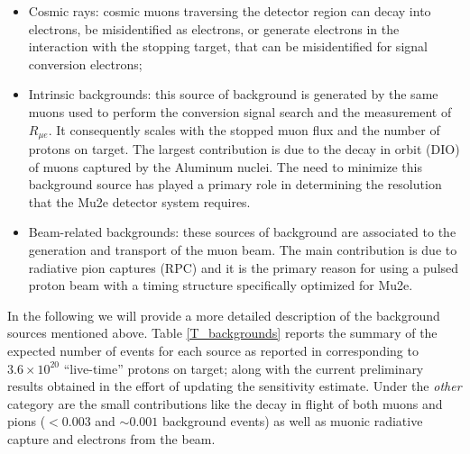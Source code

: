 \documentclass[12pt,a4paper,openright, oneside, titlepage]{book} %
\begin{document}
\begin{itemize}
\item Cosmic rays: cosmic muons traversing the detector region can decay into electrons, be misidentified as electrons, or generate electrons in the interaction with the stopping target, that can be misidentified for signal conversion electrons; 
\item Intrinsic backgrounds: this source of background is generated by the same muons used to perform the conversion signal search and the measurement of $R_{\mu e}$. 
It consequently scales with the stopped muon flux and the number of protons on target. 
The largest contribution is due to the decay in orbit (DIO) of muons captured by the Aluminum nuclei. 
The need to minimize this background source has played a primary role in determining the resolution that the Mu2e detector system requires.
\item Beam-related backgrounds: these sources of background are associated to the generation and transport of the muon beam. 
The main contribution is due to radiative pion captures (RPC) and it is the primary reason for using a pulsed proton beam with a timing structure specifically optimized  for Mu2e. 
\end{itemize}
In the following we will provide a more detailed description of the background sources mentioned above.
Table \ref{T_backgrounds} reports the summary of the expected number of events for each source as reported in \cite{CD3} corresponding to $3.6 \times 10^{20}$ ``live-time'' protons on target; along with the current preliminary results obtained in the effort of updating the sensitivity estimate. 
Under the \textit{other} category are the small contributions like the decay in flight of both muons and pions ($<0.003$ and $\sim 0.001$ background events) as well as muonic radiative capture and electrons from the beam.

\end{document}
